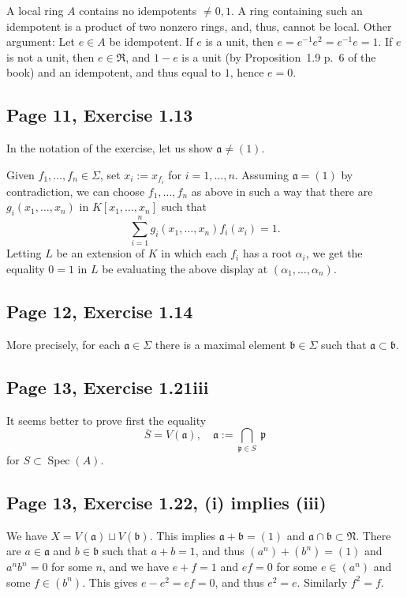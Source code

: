 \documentclass[parskip=half,fontsize=12pt]{scrartcl}%
\newcommand{\oo}{\operatorname}\newcommand{\ooo}{\operatorname*}
\newcommand{\mf}{\mathfrak}
\newcommand{\aaa}{\mf a}
\newcommand{\bbb}{\mf b}
\newcommand{\ppp}{\mf p}
\begin{document}
A local ring $A$ contains no idempotents $\neq0,1$. A ring containing such an idempotent is a product of two nonzero rings, and, thus, cannot be local. Other argument: %
Let $e\in A$ be idempotent. If $e$ is a unit, then $e=e^{-1}e^2=e^{-1}e=1$. If $e$ is not a unit, then $e\in\mathfrak R$, and $1-e$ is a unit (by Proposition~1.9 p.~6 of the book) and an idempotent, and thus equal to $1$, hence $e=0$.

\subsection{Page 11, Exercise 1.13}%

In the notation of the exercise, let us show $\aaa\neq(1)$. 

Given $f_1,\dots,f_n\in\Sigma$, set $x_i:=x_{f_i}$ for $i=1,\dots,n$. Assuming $\aaa=(1)$ by contradiction, we can choose $f_1,\dots,f_n$ as above in such a way that there are $g_i(x_1,\dots,x_n)$ in $K[x_1,\dots,x_n]$ such that 
$$
\sum_{i=1}^n g_i(x_1,\dots,x_n)f_i(x_i)=1.
$$ 
Letting $L$ be an extension of $K$ in which each $f_i$ has a root $\alpha_i$, we get the equality $0=1$ in $L$ be evaluating the above display at $(\alpha_1,\dots,\alpha_n)$.

\subsection{Page 12, Exercise 1.14}\label{114}%

More precisely, for each $\mf a\in\Sigma$ there is a maximal element $\mf b\in\Sigma$ such that $\mf a\subset\mf b$.

\subsection{Page 13, Exercise 1.21iii}%

It seems better to prove first the equality 
$$
\overline S=V(\mf a),\quad \mf a:=\bigcap_{\ppp\in S}\ \ppp
$$ 
for $S\subset\oo{Spec}(A)$.

\subsection{Page 13, Exercise 1.22, (i) implies (iii)}%

We have $X=V(\aaa)\sqcup V(\bbb)$. This implies $\aaa+\bbb=(1)$ and $\aaa\cap\bbb\subset\mf N$. There are $a\in\aaa$ and $b\in\bbb$ such that $a+b=1$, and thus $(a^n)+(b^n)=(1)$ and $a^nb^n=0$ for some $n$, and we have $e+f=1$ and $ef=0$ for some $e\in(a^n)$ and some $f\in(b^n)$. This gives $e-e^2=ef=0$, and thus $e^2=e$. Similarly $f^2=f$.
\end{document}
